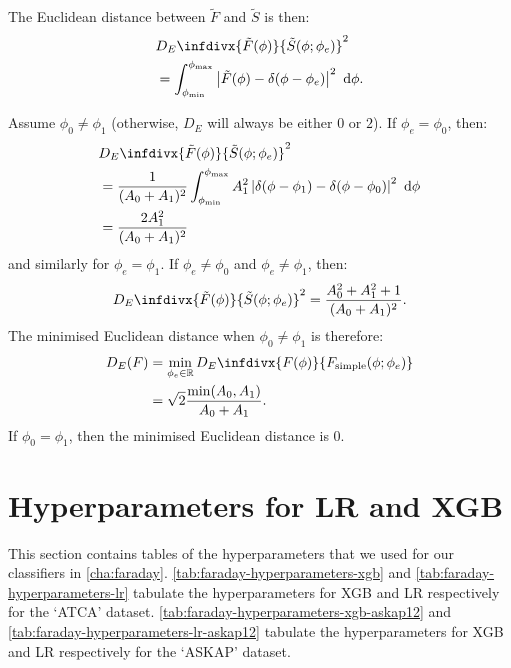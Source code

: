   The Euclidean distance between $\tilde F$ and $\tilde S$ is then:
  \begin{align}
    &D_E\infdivx{\tilde F(\phi)}{\tilde S(\phi; \phi_e)}^2\\
    &= \int_{\phi_{\min}}^{\phi_{\max}} \left|\tilde F(\phi) - \delta(\phi - \phi_e) \right|^2\ \mathrm{d}\phi.
  \end{align}

  Assume $\phi_0 \neq \phi_1$ (otherwise, $D_E$ will always be either $0$ or $2$). If $\phi_e = \phi_0$, then:
  \begin{align}
    &D_E\infdivx{\tilde F(\phi)}{\tilde S(\phi; \phi_e)}^2\\
      &= \frac{1}{(A_0 + A_1)^2} \int_{\phi_{\min}}^{\phi_{\max}} A_1^2 \left|\delta(\phi - \phi_1) - \delta(\phi - \phi_0) \right|^2\ \mathrm{d}\phi\\
      &= \frac{2 A_1^2}{(A_0 + A_1)^2}
  \end{align}
  and similarly for $\phi_e = \phi_1$. If $\phi_e \neq \phi_0$ and $\phi_e \neq \phi_1$, then:
  \begin{equation}
    D_E\infdivx{\tilde F(\phi)}{\tilde S(\phi; \phi_e)}^2 = \frac{A_0^2 + A_1^2 + 1}{(A_0 + A_1)^2}.
  \end{equation}
  The minimised Euclidean distance when $\phi_0 \neq \phi_1$ is therefore:
  \begin{align}
      D_E(F) &= \min_{\phi_e \in \mathbb{R}} D_E\infdivx{F(\phi)}{F_{\mathrm{simple}}(\phi; \phi_e)}\\
          &= \sqrt{2} \frac{\min(A_0, A_1)}{A_0 + A_1}.
  \end{align}
  If $\phi_0 = \phi_1$, then the minimised Euclidean distance is 0.

\section{Hyperparameters for LR and XGB}
\label{sec:faraday-hyperparameters}

  This section contains tables of the hyperparameters that we used for our classifiers in \autoref{cha:faraday}. \autoref{tab:faraday-hyperparameters-xgb} and \autoref{tab:faraday-hyperparameters-lr} tabulate the hyperparameters for XGB and LR respectively for the `ATCA' dataset. \autoref{tab:faraday-hyperparameters-xgb-askap12} and \autoref{tab:faraday-hyperparameters-lr-askap12} tabulate the hyperparameters for XGB and LR respectively for the `ASKAP' dataset.

